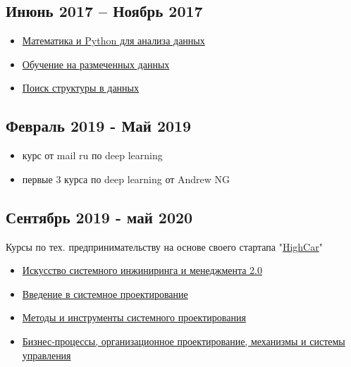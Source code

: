 \documentclass[11pt]{article}
\begin{document}
\subsection{Инюнь 2017 – Ноябрь 2017}
\label{sec:org7075b0d}
\begin{itemize}
\item \href{https://www.coursera.org/account/accomplishments/records/W46YJPAQ368V?utm\_source=link\&utm\_medium=certificate\&utm\_content=cert\_image\&utm\_campaign=sharing\_cta\&utm\_product=course}{Математика и Python для анализа данных}
\item \href{https://www.coursera.org/account/accomplishments/records/76L9YZ5TLEGL?utm\_source=link\&utm\_medium=certificate\&utm\_content=cert\_image\&utm\_campaign=sharing\_cta\&utm\_product=course}{Обучение на размеченных данных}
\item \href{https://www.coursera.org/account/accomplishments/records/2ECJXE69PBZH?utm\_source=link\&utm\_medium=certificate\&utm\_content=cert\_image\&utm\_campaign=sharing\_cta\&utm\_product=course}{Поиск структуры в данных}
\end{itemize}
\subsection{Февраль 2019 - Май 2019}
\label{sec:orgeaebe6a}
\begin{itemize}
\item курс от mail ru по deep learning
\item первые 3 курса по deep learning от Andrew NG
\end{itemize}
\subsection{Сентябрь 2019 - май 2020}
\label{sec:orgaf0dab0}
Курсы по тех. предпринимательству на основе своего стартапа "\href{https://docs.google.com/presentation/d/1AiwyzLKDgDXIaclUwoyGgT-VDJMtJYJQqAMVfbNlB40/edit?usp=sharing}{HighCar}"
\begin{itemize}
\item \href{https://www.coursera.org/account/accomplishments/records/UF4QZY62S5XW?utm\_source=link\&utm\_medium=certificate\&utm\_content=cert\_image\&utm\_campaign=sharing\_cta\&utm\_product=course}{Искусство системного инжиниринга и менеджмента 2.0}
\item \href{https://www.coursera.org/account/accomplishments/records/5HJ67CLZ74A4?utm\_source=link\&utm\_medium=certificate\&utm\_content=cert\_image\&utm\_campaign=sharing\_cta\&utm\_product=course}{Введение в системное проектирование}
\item \href{https://www.coursera.org/account/accomplishments/records/UTWB2YAP5Q6M?utm\_source=link\&utm\_medium=certificate\&utm\_content=cert\_image\&utm\_campaign=sharing\_cta\&utm\_product=course}{Методы и инструменты системного проектирования}
\item \href{https://www.coursera.org/account/accomplishments/records/VC79PW276TKT?utm\_source=link\&utm\_medium=certificate\&utm\_content=cert\_image\&utm\_campaign=sharing\_cta\&utm\_product=course}{Бизнес-процессы, организационное проектирование, механизмы и системы управления}
\end{itemize}
\end{document}
